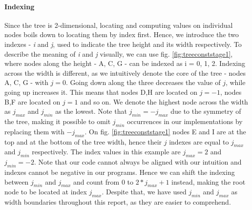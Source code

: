 \paragraph{Indexing} Since the tree is 2-dimensional, locating and computing values on individual nodes boils down to locating them by index first. Hence, we introduce the two indexes - \textit{i} and \textit{j}, used to indicate the tree height and its width respectively. To describe the meaning of \textit{i} and \textit{j} visually, we can use fig. \ref{fig:treeconststage1}, where nodes along the height - A, C, G - can be indexed as i = 0, 1, 2. Indexing across the width is different, as we intuitively denote the core of the tree - nodes A, C, G - with $j=0$. Going down along the three decreases the value of $j$, while going up increases it. This means that nodes D,H are located on $j=-1$, nodes B,F are located on $j=1$ and so on. We denote the highest node across the width as $j_{max}$ and $j_{min}$ as the lowest. Note that $j_{min}=-j_{max}$ due to the symmetry of the tree, making it possible to omit $j_{min}$ occurrences in our implementations by replacing them with $-j_{max}$. On fig. \ref{fig:treeconststage1} nodes E and I are at the top and at the bottom of the tree width, hence their $j$ indexes are equal to $j_{max}$ and $j_{min}$ respectively. The index values in this example are $j_{max}=2$ and $j_{min}=-2$. Note that our code cannot always be aligned with our intuition and indexes cannot be negative in our programs. Hence we can shift the indexing between $j_{min}$ and $j_{max}$ and count from $0$ to $2*j_{max}+1$ instead, making the root node to be located at index $j_{max}$. Despite that, we have used $j_{min}$ and $j_{max}$ as width boundaries throughout this report, as they are easier to comprehend.

